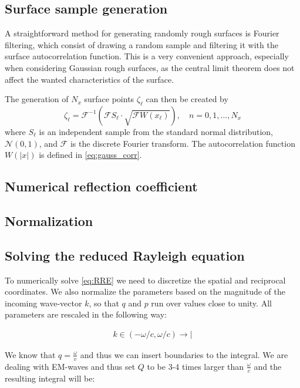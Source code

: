 \documentclass[../main.tex]{subfiles}
\begin{document}
\subsection{Surface sample generation}
A straightforward method for generating randomly rough surfaces is Fourier filtering, 
which consist of drawing a random sample and filtering
it with the surface autocorrelation function.
This is a very convenient approach, 
especially when considering Gaussian rough surfaces, 
as the central limit theorem does not affect the wanted characteristics of the surface.

The generation of $N_x$ surface points $\zeta_\ell$ can then be created by
\begin{equation}
    \zeta_\ell = \mathcal{F}^{-1} \left(\mathcal{F} S_\ell \cdot \sqrt{\mathcal{F} W(x_\ell)}\right),\quad n = 0,1,...,N_x
\end{equation}
where $S_\ell$ is an independent sample from the standard normal distribution, 
$\mathcal{N}(0,1)$, and $\mathcal{F}$ is the discrete Fourier transform.
The autocorrelation function $W(|x|)$ is defined in \autoref{eq:gauss_corr}.

\subsection{Numerical reflection coefficient}


\subsection{Normalization}

\subsection{Solving the reduced Rayleigh equation}

To numerically solve \autoref{eq:RRE} we need to discretize the spatial and reciprocal coordinates. We also normalize the parameters based on the magnitude of the incoming wave-vector $k$, so that $q$ and $p$ run over values close to unity. All parameters are rescaled in the following way:

\begin{align*}
    k \in (-\omega/c, \omega/c) \rightarrow|
\end{align*}

We know that $q = \frac{\omega}{v}$ and thus we can insert boundaries to the integral. We are dealing with EM-waves and thus set $Q$ to be 3-4 times larger than $\frac{\omega}{c}$ and the resulting integral will be:
\end{document}
